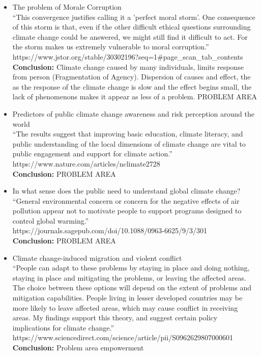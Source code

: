     \begin{itemize}
        \item The problem of Morale Corruption\\
            “This convergence justifies calling it a 'perfect moral storm'. One consequence of this storm is that, even if the other difficult ethical questions surrounding climate change could be answered, we might still find it difficult to act. For the storm makes us extremely vulnerable to moral corruption.”\\
            https://www.jstor.org/stable/30302196?seq=1\#page\_scan\_tab\_contents\\
            \textbf{Conclusion: } Climate change caused by many individuals, limits response from person (Fragmentation of Agency). Dispersion of causes and effect, the as the response of the climate change is slow and the effect begins small, the lack of phenomenons makes it appear as less of a problem. PROBLEM AREA
            
            \item Predictors of public climate change awareness and risk perception around the world\\
            “The results suggest that improving basic education, climate literacy, and public understanding of the local dimensions of climate change are vital to public engagement and support for climate action.”\\
            https://www.nature.com/articles/nclimate2728\\
            \textbf{Conclusion: } PROBLEM AREA
            
            \item In what sense does the public need to understand global climate change?\\
            “General environmental concern or concern for the negative effects of air pollution appear not to motivate people to support programs designed to control global warming.”\\
            https://journals.sagepub.com/doi/10.1088/0963-6625/9/3/301\\
            \textbf{Conclusion: } PROBLEM AREA
            
            \item Climate change-induced migration and violent conflict\\
            “People can adapt to these problems by staying in place and doing nothing, staying in place and mitigating the problems, or leaving the affected areas. The choice between these options will depend on the extent of problems and mitigation capabilities. People living in lesser developed countries may be more likely to leave affected areas, which may cause conflict in receiving areas. My findings support this theory, and suggest certain policy implications for climate change.”\\
            https://www.sciencedirect.com/science/article/pii/S0962629807000601\\
            \textbf{Conclusion: } Problem area empowerment
            

\end{itemize}
